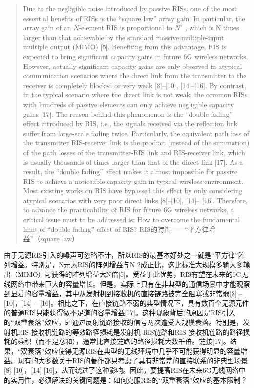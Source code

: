 \documentclass[UTF8]{ctexart}
\begin{document}
    \begin{quote}
Due to the negligible noise introduced by passive RISs, one of the most
essential benefits of RISs is the ``square law'' array gain. In
particular, the array gain of an \(N\)-element RIS is proportional to
\(N^2\) , which is N times larger than that achievable by the standard
massive multiple-input multiple output (MIMO) {[}5{]}. Benefiting from
this advantage, RIS is expected to bring significant capacity gains in
future 6G wireless networks. However, actually significant capacity
gains are only observed in atypical communication scenarios where the
direct link from the transmitter to the receiver is completely blocked
or very weak {[}8{]}--{[}10{]}, {[}14{]}--{[}16{]}. By contrast, in the
typical scenario where the direct link is not weak, the common RISs with
hundreds of passive elements can only achieve negligible capacity gains
{[}17{]}. The reason behind this phenomenon is the ``double fading''
effect introduced by RIS, i.e., the signals received via the reflection
link suffer from large-scale fading twice. Particularly, the equivalent
path loss of the transmitter RIS-receiver link is the product (instead
of the summation) of the path losses of the transmitter-RIS link and
RIS-receiver link, which is usually thousands of times larger than that
of the direct link {[}17{]}. As a result, the ``double fading'' effect
makes it almost impossible for passive RIS to achieve a noticeable
capacity gain in typical wireless environment. Most existing works on
RIS have bypassed this effect by only considering atypical scenarios
with very poor direct links {[}8{]}--{[}10{]}, {[}14{]}-- {[}16{]}.
Therefore, to advance the practicability of RIS for future 6G wireless
networks, a critical issue must to be addressed is: How to overcome the
fundamental limit of ``double fading'' effect of RIS?
RIS的特性------``平方律增益''（square law）
\end{quote}

由于无源RIS引入的噪声可忽略不计，所以RIS的最基本好处之一就是``平方律''阵列增益。特别是，N元素RIS的阵列增益与N
2成正比，这比标准大规模多输入多输出（MIMO）可获得的阵列增益大N倍{[}5{]}。受益于此优势，RIS有望在未来的6G无线网络中带来巨大的容量增长。但是，实际上只有在非典型的通信场景中才能观察到显着的容量增益，其中从发射机到接收机的直接链路被完全阻塞或非常弱{[}8{]}
-- {[}10{]}，{[}14{]} --
{[}16{]}。相比之下，在直接链路不弱的典型情况下，具有数百个无源元件的普通RIS只能获得微不足道的容量增益{[}17{]}。这种现象背后的原因是RIS引入的``双重衰落''效应，即通过反射链路接收的信号两次遭受大规模衰落。特别是，发射机RIS-接收机链路的等效路径损耗是发射机-RIS链路和RIS-接收机链路的路径损耗的乘积（而不是总和），通常比直接链路的路径损耗大数千倍。链接{[}17{]}。结果，``双衰落''效应使得无源RIS在典型的无线环境中几乎不可能获得明显的容量增益。现有的大多数关于RIS的著作都只考虑了具有非常差的直接联系的非典型场景{[}8{]}-{[}10{]}，{[}14{]}-{[}16{]}，从而绕过了这种影响。因此，要提高RIS在未来6G无线网络中的实用性，必须解决的关键问题是：如何克服RIS的``双重衰落''效应的基本限制？
\end{document}
